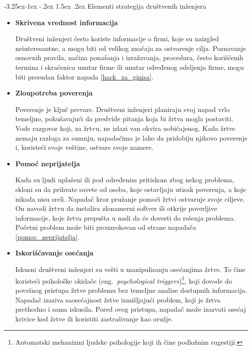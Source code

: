 \documentclass[a4paper]{article}
\makeatletter
\renewcommand\paragraph{\@startsection{paragraph}{4}{\z@}%
   {-3.25ex\@plus -1ex \@minus -.2ex}%
   {1.5ex \@plus .2ex}%
   {\normalfont\normalsize\bfseries}}
\makeatother
\begin{document}
\paragraph{Elementi strategija društvenih inženjera}
\begin{itemize}
\item \textbf{Skrivena vrednost informacija}

Društveni inženjeri često koriste informacije o firmi, koje su naizgled neinteresantne, a mogu biti od velikog značaja za ostvarenje cilja. Poznavanje osnovnih pravila, načina ponašanja i izražavanja, procedura, često korišćenih termina i skraćenica unutar firme ili unutar određenog odeljenja firme, mogu biti presudan faktor napada \ref{hack_za_ginisa}.

\item \textbf{Zloupotreba poverenja}

Poverenje je ključ prevare. Društveni inženjeri 
planiraju svoj napad vrlo temeljno, pokušavajući da 
predvide pitanja koja bi žrtva mogla postaviti. Vode 
razgovor koji, za žrtvu, ne izlazi van okvira 
uobičajenog. Kada žrtve nemaju razloga za sumnju, 
napadačima je lako da pridobiju njihovo poverenje i, 
koristeći svoje veštine, ostvare svoje namere.

\item \textbf{Pomoć neprijatelja}

Kada su ljudi uplašeni ili pod određenim pritiskom 
zbog nekog problema, skloni su da prihvate savete od 
osoba, koje ostavljaju utisak poverenja, a koje nikada
nisu sreli. Napadač kroz pružanje pomoći žrtvi
ostvaruje svoje ciljeve. On navodi žrtvu da instalira 
zlonamerni softver ili otkrije poverljive informacije, koje žrtva prepušta u nadi da će dovesti do rešenja 
problema. Početni problem može biti prouzrokovan od strane napadača \ref{pomoc_neprijatelja}.

\item \textbf{Iskorišćavanje osećanja}

Iskusni društveni inženjeri su vešti u manipulisanju 
osećanjima žrtve. To čine koristeći psihološke okidače (eng.~{\em psychological 
triggers})\footnote{Automatski mehanizmi ljudske psihologije koji ih čine podložnim sugestiji.}, koji 
dovode do površnog pristupa žrtve problemu bez 
temeljne analize dostupnih informacija. Napadač 
izaziva saosećajnost žrtve izmišljajući problem, koji 
je žrtva prethodno i sama iskusila. Pored ovog 
pristupa, napadač može izazvati osećaj krivice kod 
žrtve ili koristiti zastrašivanje kao oružje.
\end{itemize}
\end{document}
